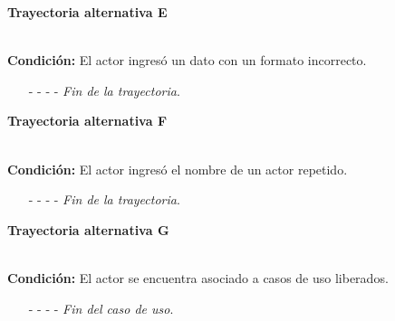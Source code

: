 \hypertarget{CU10-2:TAE}{\textbf{Trayectoria alternativa E}}\\
\noindent \textbf{Condición:} El actor ingresó un dato con un formato incorrecto.
\begin{enumerate}
	\UCpaso[\UCsist] Muestra el mensaje  señalando el campo que presenta el error en la pantalla .
	\UCpaso Regresa al paso \ref{CU10.2-P6} de la trayectoria principal.
	\item[- -] - - {\em {Fin de la trayectoria}}.
\end{enumerate}
\hypertarget{CU10-2:TAF}{\textbf{Trayectoria alternativa F}}\\
\noindent \textbf{Condición:} El actor ingresó el nombre de un actor repetido.
\begin{enumerate}
	\UCpaso[\UCsist] Muestra el mensaje  señalando el campo que presenta la duplicidad en la pantalla .
	\UCpaso Regresa al paso \ref{CU10.2-P6} de la trayectoria principal.
	\item[- -] - - {\em {Fin de la trayectoria}}.
\end{enumerate}
\hypertarget{CU10-2:TAG}{\textbf{Trayectoria alternativa G}}\\
\noindent \textbf{Condición:} El actor se encuentra asociado a casos de uso liberados.
\begin{enumerate}
	\UCpaso[\UCsist] Oculta el botón \editar del actor que esta asociado a casos de uso liberados.
	\item[- -] - - {\em {Fin del caso de uso}}.
\end{enumerate}

